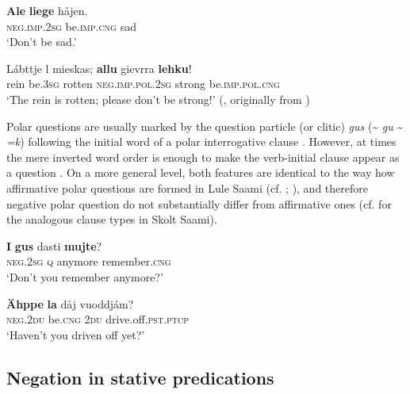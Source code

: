 \documentclass[output=paper,colorlinks,citecolor=brown]{langscibook}
\begin{document}
\ea\label{ex:lul:14} 
    \gll \textbf{Ale} \textbf{liege} håjen. \\ 
         \textsc{neg.imp.2sg} be.\textsc{imp.cng} sad \\
    \glt ‘Don’t be sad.’ \citep{SIKOR2021}
\z 

\ea\label{ex:lul:15} 
    \gll Lábttje l mieskas; \textbf{allu} gievrra \textbf{lehku}! \\ 
         rein be.\textsc{3sg} rotten \textsc{neg.imp.pol.2sg} strong be.\textsc{imp.pol.cng} \\
    \glt  ‘The rein is rotten; please don’t be strong!’ (\citealt{SIKOR2021}, originally from \citealt[544]{Qvigstad1929})
\z 

Polar questions are usually marked by the question particle (or clitic) \textit{gus} ({\textasciitilde} \textit{gu} {\textasciitilde} \textit{=k}) following the initial word of a polar interrogative clause . However, at times the mere inverted word order is enough to make the verb-initial clause appear as a question . On a more general level, both features are identical to the way how affirmative polar questions are formed in Lule Saami (cf. \citealt[95]{Spiik1989}; \citealt[145]{Ylikoski2022}), and therefore negative polar question do not substantially differ from affirmative ones (cf. \citealt[373]{MiestamoKoponen2015} for the analogous clause types in Skolt Saami).

\ea\label{ex:lul:16} 
    \gll \textbf{I} \textbf{gus} dasti \textbf{mujte}? \\ 
          \textsc{neg.2sg} \textsc{q} anymore remember.\textsc{cng} \\
    \glt ‘Don’t you remember anymore?’ \citep{SIKOR2021}
\z 

\ea\label{ex:lul:17} 
    \gll \textbf{Ähppe} \textbf{la} dåj vuoddjám? \\ 
         \textsc{neg.2du} be.\textsc{cng} \textsc{2du} drive.off.\textsc{pst.ptcp} \\
    \glt  ‘Haven’t you driven off yet?’ \citep{SIKOR2021}
\z 

\subsection{Negation in stative predications} \label{sec:lul:2.3}
\end{document}
